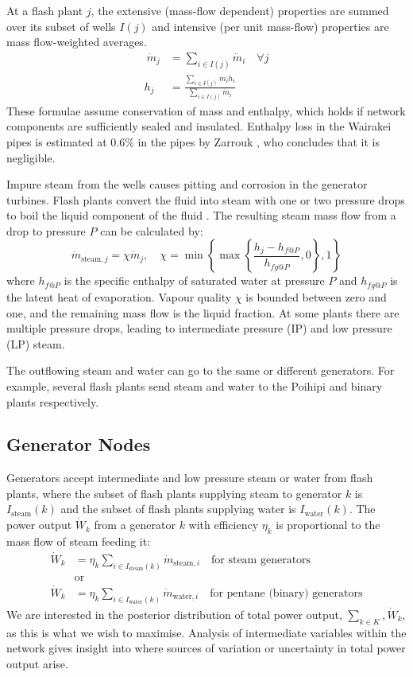 \documentclass[a4paper, 12pt]{article}
\newlength{\drop}
\begin{document}
At a flash plant $j$, the extensive (mass-flow dependent) properties are summed over its subset of wells $I(j)$ and intensive (per unit mass-flow) properties are mass flow-weighted averages.
\begin{align} \
\dot{m}_j &= \sum_{i\in I(j)} \dot{m}_i\quad \forall j \label{eq:fp_mf} \\
h_j &= \frac{\sum_{i\in I(j)} \dot{m}_i h_i}{\sum_{i\in I(j)} \dot{m}_i} \label{eq:fp_h}
\end{align}
These formulae assume conservation of mass and enthalpy, which holds if network components are sufficiently sealed and insulated. Enthalpy loss in the Wairakei pipes is estimated at 0.6\% in the pipes by Zarrouk \cite{Zarrouk:2014}, who concludes that it is negligible.

Impure steam from the wells causes pitting and corrosion in the generator turbines. Flash plants convert the fluid into steam with one or two pressure drops to boil the liquid component of the fluid \cite{Grant:2011}. The resulting steam mass flow from a drop to pressure $P$ can be calculated by:
\begin{equation}
\dot{m}_{\text{steam},j} = \chi\dot{m}_j,\quad \chi= \min{\left\{\max{\left\{\frac{h_j - h_{f@P}}{h_{fg@P}}, 0\right\}}, 1\right\}}
\end{equation}
where $h_{f@P}$ is the specific enthalpy of saturated water at pressure $P$ and $h_{fg@P}$ is the latent heat of evaporation. Vapour quality $\chi$ is bounded between zero and one, and the remaining mass flow is the liquid fraction. At some plants there are multiple pressure drops, leading to intermediate pressure (IP) and low pressure (LP) steam.

The outflowing steam and water can go to the same or different generators. For example, several flash plants send steam and water to the Poihipi and binary plants respectively.

\subsection{Generator Nodes}
Generators accept intermediate and low pressure steam or water from flash plants, where the subset of flash plants supplying steam to generator $k$ is $I_{\text{steam}}(k)$ and the subset of flash plants supplying water is $I_{\text{water}}(k)$. The power output $\dot{W}_k$ from a generator $k$ with efficiency $\eta_k$ is proportional to the mass flow of steam feeding it:
\begin{align}
\dot{W}_k &= \eta_k \sum_{i\in I_{\text{steam}}(k)} \dot{m}_{\text{steam},i}\quad\text{for steam generators}\\
&\text{or}\nonumber\\
\dot{W}_k &= \eta_k \sum_{i\in I_{\text{water}}(k)} \dot{m}_{\text{water},i}\quad\text{for pentane (binary) generators} \label{eq:power}
\end{align}
We are interested in the posterior distribution of total power output, $\sum_{k\in K}, \dot{W}_k$, as this is what we wish to maximise. Analysis of intermediate variables within the network gives insight into where sources of variation or uncertainty in total power output arise.
\end{document}
